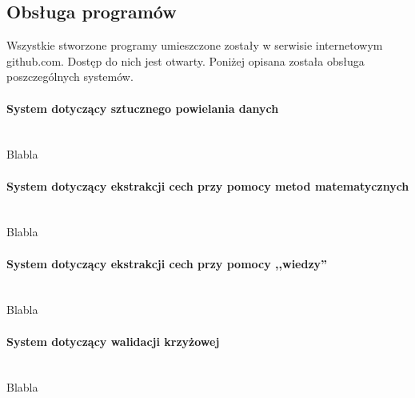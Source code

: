 \renewcommand{\appendixtocname}{Dodatki}
\renewcommand{\appendixpagename}{Dodatki}

\clearpage

\begin{appendices}
\section{Obsługa programów}
Wszystkie stworzone programy umieszczone zostały w serwisie internetowym github.com. Dostęp do nich jest otwarty. Poniżej opisana została obsługa poszczególnych systemów.

\paragraph{System dotyczący sztucznego powielania danych}\mbox{}\\
Blabla

\paragraph{System dotyczący ekstrakcji cech przy pomocy metod matematycznych}\mbox{}\\
Blabla

\paragraph{System dotyczący ekstrakcji cech przy pomocy ,,wiedzy''}\mbox{}\\
Blabla

\paragraph{System dotyczący walidacji krzyżowej}\mbox{}\\
Blabla

\end{appendices}

